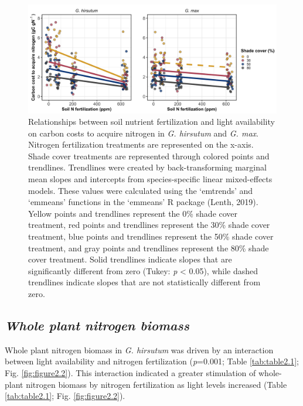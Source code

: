\newpage
\begin{landscape}
\begin{figure}
    \includegraphics[scale = 0.061]{ch2_LxN_Greenhouse/figs/fig1_ncost.png}
    \centering
    \caption[Relationships between soil nitrogen fertilization and light availability on carbon costs to acquire nitrogen in \textit{G. hirsutum} and \textit{G. max}]{Relationships between soil nutrient fertilization and light availability on carbon costs to acquire nitrogen in \textit{G. hirsutum} and \textit{G. max}. Nitrogen fertilization treatments are represented on the x-axis. Shade cover treatments are represented through colored points and trendlines. Trendlines were created by back-transforming marginal mean slopes and intercepts from species-specific linear mixed-effects models. These values were calculated using the ‘emtrends’ and ‘emmeans’ functions in the ‘emmeans’ R package (Lenth, 2019). Yellow points and trendlines represent the 0\% shade cover treatment, red points and trendlines represent the 30\% shade cover treatment, blue points and trendlines represent the 50\% shade cover treatment, and gray points and trendlines represent the 80\% shade cover treatment. Solid trendlines indicate slopes that are significantly different from zero (Tukey: \textit{p} < 0.05), while dashed trendlines indicate slopes that are not statistically different from zero.}
    \label{fig:figure2.1}
\end{figure}
\end{landscape}
\clearpage

\newpage
\subsection{\textit{Whole plant nitrogen biomass}}
\noindent Whole plant nitrogen biomass in \textit{G. hirsutum} was driven by an interaction between light availability and nitrogen fertilization (\textit{p}=0.001; Table \ref{tab:table2.1}; Fig. \ref{fig:figure2.2}). This interaction indicated a greater stimulation of whole-plant nitrogen biomass by nitrogen fertilization as light levels increased (Table \ref{tab:table2.1}; Fig. \ref{fig:figure2.2}).

